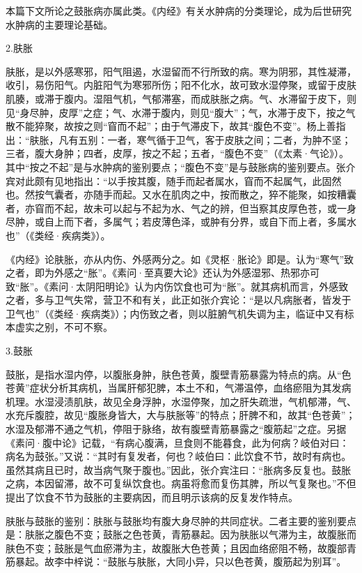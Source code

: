\documentclass[draft,12pt]{ctexbook}
\begin{document}
本篇下文所论之鼓胀病亦属此类。《内经》有关水肿病的分类理论，成为后世研究水肿病的主要理论基础。

2.肤胀

肤胀，是以外感寒邪，阳气阻遏，水湿留而不行所致的病。寒为阴邪，其性凝滞，收引，易伤阳气。内脏阳气为寒邪所伤；阳不化水，故可致水湿停聚，或留于皮肤肌腠，或滞于腹内。湿阻气机，气郁滞塞，而成肤胀之病。气、水滞留于皮下，则见“身尽肿，皮厚”之症；气、水滞于腹内，则见“腹大”；气，水滞于皮下，按之气散不能猝聚，故按之则“窅而不起”；由于气滞皮下，故其“腹色不变”。杨上善指出：“肤胀，凡有五别：一者，寒气循于卫气，客于皮肤之间；二者，为肿不坚；三者，腹大身肿；四者，皮厚，按之不起；五者，“腹色不变”（《太素·气论》）。其中“按之不起”是与水肿病的鉴别要点；“腹色不变”是与鼓胀病的鉴别要点。张介宾对此颇有见地指出：“以手按其腹，随手而起者属水，窅而不起属气，此固然也。然按气囊者，亦随手而起。又水在肌肉之中，按而散之，猝不能聚，如按糟囊者，亦窅而不起，故未可以起与不起为水、气之的辨，但当察其皮厚色苍，或一身尽肿，或自上而下者，多属气；若皮薄色泽，或肿有分界，或自下而上者，多属水也”（《类经·疾病类》）。

《内经》论肤胀，亦从内伤、外感两分之。如《灵枢·胀论》即是。认为“寒气”致之者，即为外感之“胀”。《素问·至真要大论》还认为外感湿邪、热邪亦可致“胀”。《素问·太阴阳明论》认为内伤饮食也可为“胀”。就其病机而言，外感致之者，多与卫气失常，营卫不和有关，此正如张介宾论：“是以凡病胀者，皆发于卫气也”（《类经·疾病类》）；内伤致之者，则以脏腑气机失调为主，临证中又有标本虚实之别，不可不察。

3.鼓胀

鼓胀，是指水湿内停，以腹胀身肿，肤色苍黄，腹壁青筋暴露为特点的病。从“色苍黄”症状分析其病机，当属肝郁犯脾，本土不和，气滞温停，血络瘀阻为其发病机理。水湿浸渍肌肤，故见全身浮肿，水湿停聚，加之肝失疏泄，气机郁滞，气、水充斥腹腔，故见“腹胀身皆大，大与肤胀等”的特点；肝脾不和，故其“色苍黄”；水湿及郁滞不通之气机，停阻于脉络，故有腹壁青筋暴露之“腹筋起”之症。另据《素问·腹中论》记载，“有病心腹满，旦食则不能暮食，此为何病？岐伯对曰：病名为鼓张。”又说：“其时有复发者，何也？岐伯曰：此饮食不节，故时有病也。虽然其病且已时，故当病气聚于腹也。”因此，张介宾注曰：“胀病多反复也。鼓胀之病，本因留滞，故不可复纵饮食也。病虽将愈而复伤其脾，所以气复聚也。”不但提出了饮食不节为鼓胀的主要病因，而且明示该病的反复发作特点。

肤胀与鼓胀的鉴别：肤胀与鼓胀均有腹大身尽肿的共同症状。二者主要的鉴别要点是：肤胀之腹色不变；鼓胀之色苍黄，青筋暴起。因为肤胀以气滞为主，故腹胀而肤色不变；鼓胀是气血瘀滞为主，故腹胀大色苍黄；且因血络瘀阻不畅，故腹部青筋暴起。故李中梓说：“鼓胀与肤胀，大同小异，只以色苍黄，腹筋起为别耳”。
\end{document}
